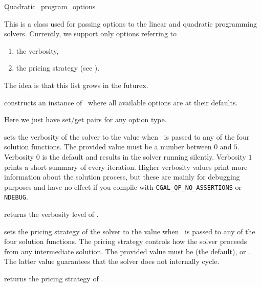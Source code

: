 \begin{ccRefClass}{Quadratic_program_options}


\ccDefinition
This is a class used for passing options to the linear and
quadratic programming solvers. Currently, we support only
options referring to
\begin{enumerate}
\item the verbosity, 
\item the pricing strategy (see ).
\end{enumerate}
The idea is that this list grows in the futurex.

\ccCreation
\ccIndexClassCreation
{}

{constructs an instance of \ccRefName\ where all available options
are at their defaults.}

\ccOperations
Here we just have set/get pairs for any option type.


{sets the verbosity of the solver to the value  when
\ccVar\ is passed to any of the four solution functions. The provided
value must be a number between $0$ and $5$. Verbosity $0$ is the default and
results in the solver running silently. Verbosity $1$ prints a short
summary of every iteration. Higher verbosity values print more information
about the solution process, but these are mainly for debugging 
purposes and have no effect if you compile with 
\texttt{CGAL\_QP\_NO\_ASSERTIONS} or \texttt{NDEBUG}.}

{returns the verbosity level of \ccVar.}


{sets the pricing strategy of the solver to the value 
when \ccVar\ is passed to any of the four solution functions. The pricing
strategy controls how the solver proceeds from any intermediate solution.
The provided value must be  (the default), or 
. The latter value guarantees that the solver does
not internally cycle.}

{returns the pricing strategy of \ccVar.}

\ccExample
{}

\ccSeeAlso

\\
\\
\\
\end{ccRefClass}
